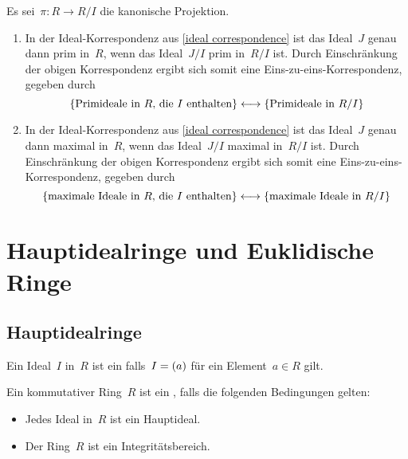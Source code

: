 \begin{theorem}
  Es sei~$\pi \colon R \to R/I$ die kanonische Projektion.
  \begin{enumerate}
    \item
      In der Ideal-Korrespondenz aus \cref{ideal correspondence} ist das Ideal~$J$ genau dann prim in~$R$, wenn das Ideal~$J/I$ prim in~$R/I$ ist.
      Durch Einschränkung der obigen Korrespondenz ergibt sich somit eine Eins-zu-eins-Korrespondenz, gegeben durch
      \[
        \{
          \text{Primideale in~$R$, die~$I$ enthalten}
        \}
        \onetoone
        \{ \text{Primideale in~$R/I$} \}
      \]
    \item
      In der Ideal-Korrespondenz aus \cref{ideal correspondence} ist das Ideal~$J$ genau dann maximal in~$R$, wenn das Ideal~$J/I$ maximal in~$R/I$ ist.
      Durch Einschränkung der obigen Korrespondenz ergibt sich somit eine Eins-zu-eins-Korrespondenz, gegeben durch
      \[
        \{
          \text{maximale Ideale in~$R$, die~$I$ enthalten}
        \}
        \onetoone
        \{ \text{maximale Ideale in~$R/I$} \}
      \]
  \end{enumerate}
\end{theorem}





\section{Hauptidealringe und Euklidische Ringe}



\subsection{Hauptidealringe}

\begin{definition}
  Ein Ideal~$I$ in~$R$ ist ein  falls~$I = (a)$ für ein Element~$a \in R$ gilt.
\end{definition}

\begin{definition}
  Ein kommutativer Ring~$R$ ist ein , falls die folgenden Bedingungen gelten:
  \begin{itemize}
    \item
      Jedes Ideal in~$R$ ist ein Hauptideal.
    \item
      Der Ring~$R$ ist ein Integritätsbereich.
  \end{itemize}
\end{definition}

